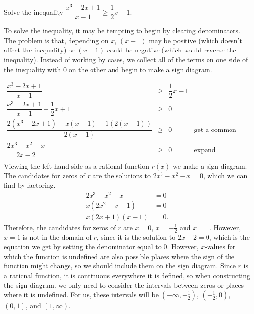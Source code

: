 \documentclass[noauthor, nooutcomes]{ximera}
\begin{document}
\begin{example}
Solve the inequality $\dfrac{x^3-2x+1}{x-1} \geq \dfrac{1}{2}x-1$.
\end{example}
\begin{explanation}
To solve the inequality, it may be tempting to begin by clearing denominators. The problem is that, depending on $x$, $(x-1)$ may be positive (which doesn't affect the inequality) or $(x-1)$ could be negative (which would reverse the inequality).  Instead of working by cases, we collect all of the terms on one side of the inequality with $0$ on the other and begin to make a sign diagram.

\[ \begin{array}{rclr}

\dfrac{x^3-2x+1}{x-1} & \geq & \dfrac{1}{2}x-1 & \\ [10pt]

\dfrac{x^3-2x+1}{x-1}  - \dfrac{1}{2} x + 1& \geq & 0& \\ [10pt]

\dfrac{2\left(x^3-2x+1\right)-x(x-1)+1(2(x-1))}{2(x-1)} & \geq & 0 & \mbox{get a common denominator} \\ [10pt]

\dfrac{2x^3-x^2-x}{2x-2} & \geq & 0 & \mbox{expand} \\

\end{array} \]
Viewing the left hand side as a rational function $r(x)$ we make a sign diagram. The candidates for zeros of $r$ are the solutions to $2x^3-x^2-x=0$, which we can find by factoring. 
\begin{align*}
2x^3 - x^2 - x & = 0 \\
x(2x^2 - x - 1) & = 0\\
x(2x + 1)(x - 1) & = 0.
\end{align*}
Therefore, the candidates for zeros of $r$ are $x = 0$, $x = -\frac{1}{2}$ and $x = 1$. However, $x = 1$ is not in the domain of $r$, since it is the solution to $2x - 2 = 0$, which is the equation we get by setting the denominator equal to 0. However, $x$-values for which the function is undefined are also possible places where the sign of the function might change, so we should include them on the sign diagram. Since $r$ is a rational function, it is continuous everywhere it is defined, so when constructing the sign diagram, we only need to consider the intervals between zeros or places where it is undefined. For us, these intervals will be $\left(-\infty, -\frac{1}{2}\right)$, $\left(-\frac{1}{2}, 0\right)$, $(0, 1)$, and $(1, \infty)$. 


\end{explanation}
\end{document}
